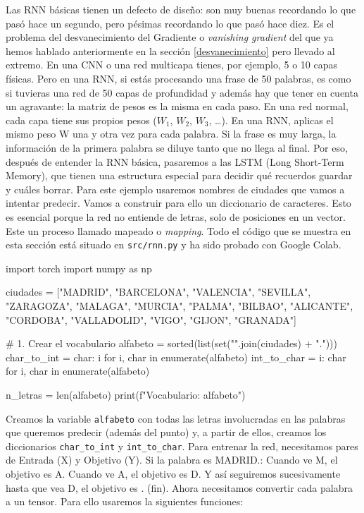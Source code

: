 \documentclass[a4paper,11pt]{article}
\begin{document}
Las RNN básicas tienen un defecto de diseño: son muy buenas recordando lo que
pasó hace un segundo, pero pésimas recordando lo que pasó hace diez. Es el
problema del desvanecimiento del Gradiente o \emph{vanishing gradient} del que
ya hemos hablado anteriormente en la sección \ref{desvanecimiento} pero llevado
al extremo. En una CNN o una red multicapa tienes, por ejemplo, 5 o 10 capas
físicas. Pero en una RNN, si estás procesando una frase de 50 palabras, es como
si tuvieras una red de 50 capas de profundidad y además hay que tener en cuenta
un agravante: la matriz de pesos es la misma en cada paso. En una red normal,
cada capa tiene sus propios pesos (\(W_1\), \(W_2\), \(W_3\), \ldots). En una
RNN, aplicas el mismo peso W una y otra vez para cada palabra. Si la frase es
muy larga, la información de la primera palabra se diluye tanto que no llega al
final. Por eso, después de entender la RNN básica, pasaremos a las LSTM (Long
Short-Term Memory), que tienen una estructura especial para decidir qué
recuerdos guardar y cuáles borrar. Para este ejemplo usaremos nombres de
ciudades que vamos a intentar predecir. Vamos a construir para ello un
diccionario de caracteres. Esto es esencial porque la red no entiende de letras,
solo de posiciones en un vector. Este un proceso llamado mapeado o
\emph{mapping}. Todo el código que se muestra en esta sección está situado en
\texttt{src/rnn.py} y ha sido probado con Google Colab.

\begin{codigo}
import torch
import numpy as np

ciudades = ["MADRID", "BARCELONA", "VALENCIA", "SEVILLA", "ZARAGOZA", 
            "MALAGA", "MURCIA", "PALMA", "BILBAO", "ALICANTE", 
            "CORDOBA", "VALLADOLID", "VIGO", "GIJON", "GRANADA"]

# 1. Crear el vocabulario 
alfabeto = sorted(list(set("".join(ciudades) + ".")))
char_to_int = {char: i for i, char in enumerate(alfabeto)}
int_to_char = {i: char for i, char in enumerate(alfabeto)}

n_letras = len(alfabeto)
print(f"Vocabulario: {alfabeto}")
\end{codigo}

Creamos la variable \texttt{alfabeto} con todas las letras involucradas
en las palabras que queremos predecir (además del punto) y, a partir de
ellos, creamos los diccionarios \texttt{char\_to\_int} y
\texttt{int\_to\_char}. Para entrenar la red, necesitamos pares de
Entrada (X) y Objetivo (Y). Si la palabra es MADRID.: Cuando ve M, el
objetivo es A. Cuando ve A, el objetivo es D. Y así seguiremos
sucesivamente hasta que vea D, el objetivo es . (fin). Ahora necesitamos
convertir cada palabra a un tensor. Para ello usaremos la siguientes
funciones:
\end{document}
